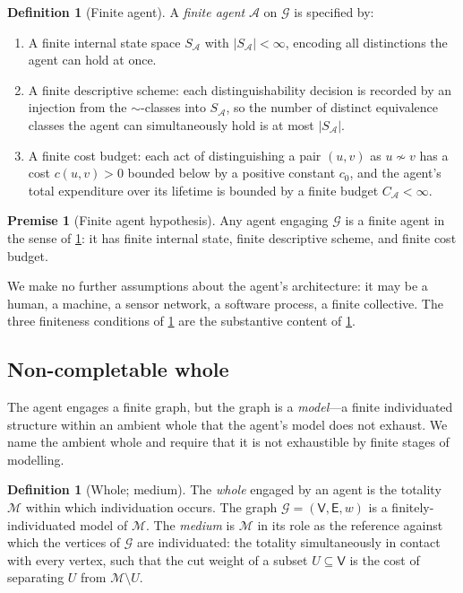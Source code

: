 \documentclass[11pt,a4paper]{article}
\theoremstyle{thmstyle}
\theoremstyle{definition}
\newtheorem{definition}[theorem]{Definition}
\newtheorem{axiom}{Premise}
\theoremstyle{remark}
\newcommand{\Graph}{\mathcal{G}}
\newcommand{\Vrt}{\mathsf{V}}
\newcommand{\Edg}{\mathsf{E}}
\newcommand{\Agent}{\mathcal{A}}
\begin{document}
\begin{definition}[Finite agent]
\label{def:agent}
A \emph{finite agent} $\Agent$ on $\Graph$ is specified by:
\begin{enumerate}[label=(F\arabic*),leftmargin=2.6em,nosep]
\item\label{F:fin_state} A finite internal state space $S_\Agent$
with $|S_\Agent| < \infty$, encoding all distinctions the agent can
hold at once.
\item\label{F:fin_descr} A finite descriptive scheme: each
distinguishability decision is recorded by an injection from the
$\sim$-classes into $S_\Agent$, so the number of distinct
equivalence classes the agent can simultaneously hold is at most
$|S_\Agent|$.
\item\label{F:fin_cost} A finite cost budget: each act of
distinguishing a pair $(u,v)$ as $u \not\sim v$ has a cost
$c(u,v) > 0$ bounded below by a positive constant $c_0$, and the
agent's total expenditure over its lifetime is bounded by a finite
budget $C_{\Agent} < \infty$.
\end{enumerate}
\end{definition}

\begin{axiom}[Finite agent hypothesis]
\label{ax:agent}
Any agent engaging $\Graph$ is a finite agent in the sense of
\cref{def:agent}: it has finite internal state, finite descriptive
scheme, and finite cost budget.
\end{axiom}

We make no further assumptions about the agent's architecture: it
may be a human, a machine, a sensor network, a software process, a
finite collective. The three finiteness conditions of
\cref{def:agent} are the substantive content of \cref{ax:agent}.

\subsection{Non-completable whole}

The agent engages a finite graph, but the graph is a
\emph{model}---a finite individuated structure within an ambient
whole that the agent's model does not exhaust. We name the
ambient whole and require that it is not exhaustible by finite
stages of modelling.

\begin{definition}[Whole; medium]
\label{def:medium}
The \emph{whole} engaged by an agent is the totality
$\mathcal{M}$ within which individuation occurs. The graph
$\Graph = (\Vrt, \Edg, w)$ is a finitely-individuated model of
$\mathcal{M}$. The \emph{medium} is $\mathcal{M}$ in its role as
the reference against which the vertices of $\Graph$ are
individuated: the totality simultaneously in contact with every
vertex, such that the cut weight of a subset $U \subseteq \Vrt$ is
the cost of separating $U$ from $\mathcal{M}\setminus U$.
\end{definition}
\end{document}
